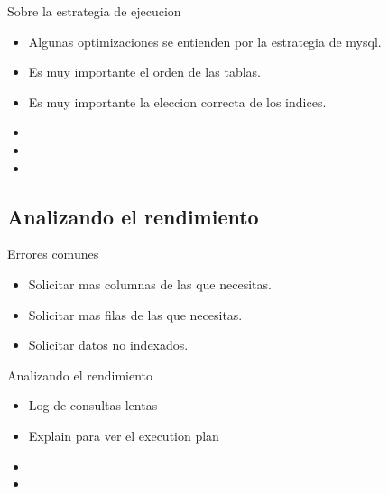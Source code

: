 \begin{frame}{Sobre la estrategia de ejecucion}
  \begin{itemize}
    \item Algunas optimizaciones se entienden por la estrategia de mysql.
    \item Es muy importante el orden de las tablas.
    \item Es muy importante la eleccion correcta de los indices.
    \item 
    \item 
    \item 
  \end{itemize}
\end{frame}

\subsection{Analizando el rendimiento}
\begin{frame}{Errores comunes}
  \begin{itemize}
    \item Solicitar mas columnas de las que necesitas.
    \item Solicitar mas filas de las que necesitas.
    \item Solicitar datos no indexados.
  \end{itemize}
\end{frame}

\begin{frame}{Analizando el rendimiento}
  \begin{itemize}
    \item Log de consultas lentas
    \item Explain para ver el execution plan
    \item 
    \item 
  \end{itemize}
\end{frame}
